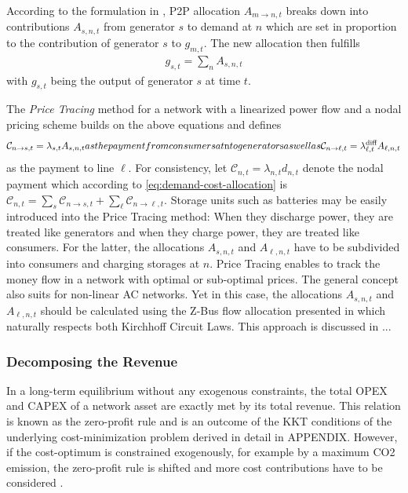 \documentclass[11pt,twocolumn]{article}
\newcommand{\generation}{g_{s,t}}
\newcommand{\nodalgeneration}[1][n]{g_{#1,t}}
\newcommand{\lmp}[1][n]{\lambda_{#1,t}}
\newcommand{\lmpdiff}[1][\ell]{\lmp[#1]^\text{diff}}
\newcommand{\demand}[1][n]{d_{#1,t}}
\newcommand{\cost}{\mathcal{C}}
\newcommand{\payment}[1][n]{\cost_{#1,t}}
\newcommand{\allocategeneratorcost}[1][n \rightarrow s]{\cost_{#1, t}}
\newcommand{\allocatelinecost}[1][n \rightarrow \ell]{\cost_{#1, t}}
\newcommand{\allocategeneration}[1][s, n]{A_{#1,t}}
\newcommand{\allocatepeer}[1][m \rightarrow n]{A_{#1,t}}
\newcommand{\allocateflow}[1][n]{A_{\ell,#1,t}}
\begin{document}
According to the formulation in \cite{schafer_tracing_2020}, \ac{P2P} allocation $\allocatepeer$ breaks down into contributions $\allocategeneration$ from generator $s$ to demand at $n$ which are set in proportion to the contribution of generator $s$ to $\nodalgeneration[m]$. The new allocation then fulfills
\begin{align}
    \generation = \sum_n \allocategeneration
    \label{eq:generation-breakdown}
\end{align}  
with $\generation$ being the output of generator $s$ at time $t$.

The \textit{Price Tracing} method for a network with a linearized power flow and a nodal pricing scheme builds on the above equations and defines  
\begin{subequations}
    \begin{align}
    \allocategeneratorcost = \lmp[s] \allocategeneration
\end{align}
as the payment from consumers at $n$ to generator $s$ as well as  
\begin{align}
    \allocatelinecost = \lmpdiff \allocateflow
\end{align}
\end{subequations}
as the payment to line $\ell$. For consistency, let $\payment = \lmp \demand$ denote the nodal payment which according to \cref{eq:demand-cost-allocation} is $\payment = \sum_s \allocategeneratorcost + \sum_\ell \allocatelinecost$. Storage units such as batteries may be easily introduced into the Price Tracing method: When they discharge power, they are treated like generators and when they charge power, they are treated like consumers. For the latter, the allocations $\allocategeneration$ and $\allocateflow$ have to be subdivided into consumers and charging storages at $n$.    
Price Tracing enables to track the money flow in a network with optimal or sub-optimal prices. The general concept also suits for non-linear \ac{AC} networks. 
Yet in this case, the allocations $\allocategeneration$ and $\allocateflow$ should be calculated using the Z-Bus flow allocation presented in \cite{conejo_z-bus_2007} which naturally respects both Kirchhoff Circuit Laws. This approach is discussed in ...



\subsubsection*{Decomposing the Revenue}

In a long-term equilibrium without any exogenous constraints, the total \ac{OPEX} and \ac{CAPEX} of a network asset are exactly met by its total revenue. This relation is known as the zero-profit rule and is an outcome of the \ac{KKT} conditions of the underlying cost-minimization problem derived in detail in APPENDIX. However, if the cost-optimum is constrained exogenously, for example by a maximum \ac{CO2} emission, the zero-profit rule is shifted and more cost contributions have to be considered \cite{brown_decreasing_2020}. 
\end{document}
